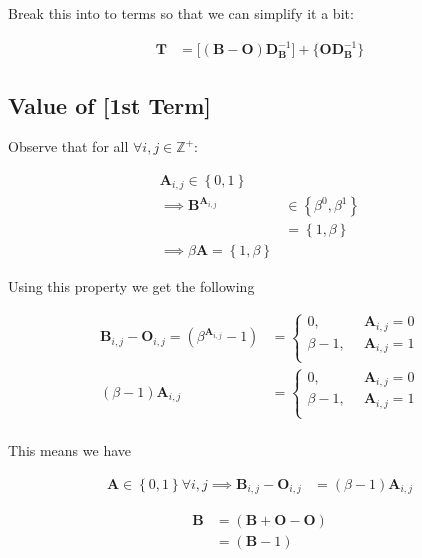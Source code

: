 \documentclass[11pt]{article}
\begin{document}
Break this into to terms so that we can simplify it a bit:


\begin{align*}
    \mathbf{T} &= \Bigg[ \left( \mathbf{B}- \mathbf{O} \right)\mathbf{D}_{\mathbf{B}}^{- 1} \Bigg] + \Bigg\{  \mathbf{O}\mathbf{D}_{\mathbf{B}}^{- 1} \Bigg\}
\end{align*}
\subsection{Value of [1st Term]}
\label{value-of-1st-term}
Observe that for all \(\forall i,j\in \mathbb{Z}^+\):


\begin{align*}
\mathbf{A}_{i, j} \in \left\{0, 1\right\} \\
\implies  \mathbf{B}^{\mathbf{A}_{i, j}} &\in \left\{\beta^0, \beta^1\right\} \\
                     &= \left\{1, \beta \right\}  \\
                      \implies  \beta \mathbf{A} = \left\{1, \beta \right\}
\end{align*}


Using this property we get the following


\begin{align*}
\mathbf{B}_{i,j}- \mathbf{O}_{i,j} = \left( \beta^{\mathbf{A}_{i,j}} -1 \right) &=
\begin{cases}
    0      , &\enspace \mathbf{A}_{i,j}=0  \\
    \beta-1, &\enspace \mathbf{A}_{i,j}=1  \\
\end{cases} \\
\left( \beta- 1 \right) \mathbf{A}_{i,j} &=
\begin{cases}
    0      , &\enspace \mathbf{A}_{i,j}=0  \\
    \beta-1, &\enspace \mathbf{A}_{i,j}=1  \\
\end{cases} \\
\end{align*}


This means we have


\begin{align*}
\mathbf{A} \in \left\{0, 1\right\} \forall i,j  \implies   \mathbf{B}_{i,j}- \mathbf{O}_{i,j} &= \left( \beta-1 \right) \mathbf{A}_{i,j}
\end{align*}



\begin{align*}
\mathbf{B}&= \left( \mathbf{B}+  \mathbf{O}- \mathbf{O} \right) \\
&= \left( \mathbf{B}- 1 \right)
\end{align*}
\end{document}
